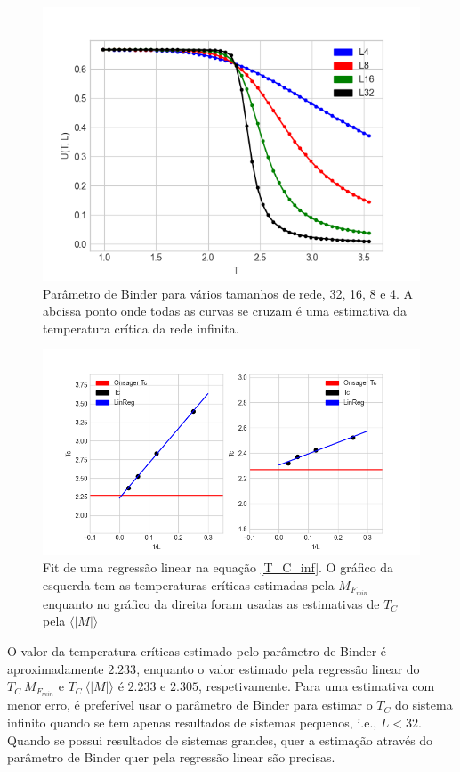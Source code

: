 \documentclass[12pt, a4paper]{article}
\begin{document}
	\begin{figure}[h]
		\centering
		\includegraphics[scale=0.6]{binder_fss.png}
		\caption{Parâmetro de Binder para vários tamanhos de rede, 32, 16, 8 e 4. A abcissa ponto onde todas as curvas se cruzam é uma estimativa da temperatura crítica da rede infinita.}
		\label{binder}
	\end{figure}
	\begin{figure}[h]
		\centering
		\includegraphics[scale=0.6]{tc_fss.png}
		\caption{Fit de uma regressão linear na equação \ref{T_C_inf}. O gráfico da esquerda tem as temperaturas críticas estimadas pela $M_{F_{min}}$ enquanto no gráfico da direita foram usadas as estimativas de $T_C$ pela $\langle |M| \rangle$}
		\label{ling_reg}
	\end{figure}
	
	O valor da temperatura críticas estimado pelo parâmetro de Binder é aproximadamente $2.233$, enquanto o valor estimado pela regressão linear do $T_C\ M_{F_{min}}$ e $T_C\ \langle |M| \rangle$ é $2.233$ e $2.305$, respetivamente. Para uma estimativa com menor erro, é preferível usar o parâmetro de Binder para estimar o $T_C$ do sistema infinito quando se tem apenas resultados de sistemas pequenos, i.e., $L<32$. Quando se possui resultados de sistemas grandes, quer a estimação através do parâmetro de Binder quer pela regressão linear são precisas.
	
\end{document}
